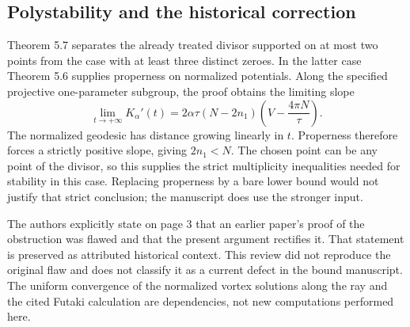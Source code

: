 \documentclass[10pt]{article}
\begin{document}
\subsection*{Polystability and the historical correction}
Theorem 5.7 separates the already treated divisor supported on at most two points from the case with at least three distinct zeroes. In the latter case Theorem 5.6 supplies properness on normalized potentials. Along the specified projective one-parameter subgroup, the proof obtains the limiting slope \[\lim_{t\to+\infty}K_\alpha'(t)
   =2\alpha\tau(N-2n_1)\left(V-\frac{4\pi N}{\tau}\right).\] The normalized geodesic has distance growing linearly in \(t\). Properness therefore forces a strictly positive slope, giving \(2n_1<N\). The chosen point can be any point of the divisor, so this supplies the strict multiplicity inequalities needed for stability in this case. Replacing properness by a bare lower bound would not justify that strict conclusion; the manuscript does use the stronger input.\par
The authors explicitly state on page 3 that an earlier paper’s proof of the obstruction was flawed and that the present argument rectifies it. That statement is preserved as attributed historical context. This review did not reproduce the original flaw and does not classify it as a current defect in the bound manuscript. The uniform convergence of the normalized vortex solutions along the ray and the cited Futaki calculation are dependencies, not new computations performed here.\par
\end{document}
